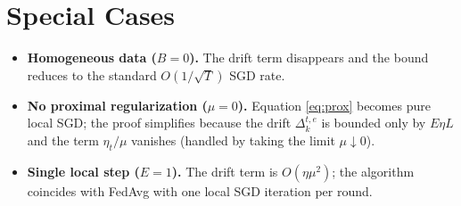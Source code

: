 \documentclass{article}
\begin{document}
\section*{Special Cases}
\begin{itemize}[leftmargin=*]
\item \textbf{Homogeneous data ($B=0$).} The drift term disappears and the bound reduces to the standard $O(1/\sqrt{T})$ SGD rate.
\item \textbf{No proximal regularization ($\mu=0$).} Equation \eqref{eq:prox} becomes pure local SGD; the proof simplifies because the drift $\Delta_{k}^{t,e}$ is bounded only by $E\eta L$ and the term $\eta_t/\mu$ vanishes (handled by taking the limit $\mu\downarrow0$).
\item \textbf{Single local step ($E=1$).} The drift term is $O(\eta\mu^{2})$; the algorithm coincides with FedAvg with one local SGD iteration per round.
\end{itemize}
\end{document}
